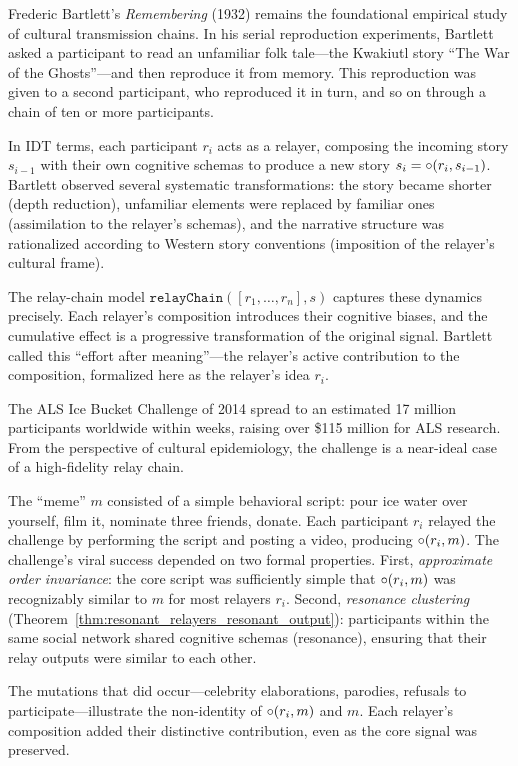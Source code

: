 \begin{example}
\label{ex:bartlett}
Frederic Bartlett's \textit{Remembering} (1932) remains the foundational
empirical study of cultural transmission chains.  In his serial
reproduction experiments, Bartlett asked a participant to read an unfamiliar
folk tale---the Kwakiutl story ``The War of the Ghosts''---and then
reproduce it from memory.  This reproduction was given to a second
participant, who reproduced it in turn, and so on through a chain of ten or
more participants.

In IDT terms, each participant $r_i$ acts as a relayer, composing the
incoming story $s_{i-1}$ with their own cognitive schemas to produce a new
story $s_i = \circ(r_i, s_{i-1})$.  Bartlett observed several systematic
transformations: the story became shorter (depth reduction), unfamiliar
elements were replaced by familiar ones (assimilation to the relayer's
schemas), and the narrative structure was rationalized according to Western
story conventions (imposition of the relayer's cultural frame).

The relay-chain model $\texttt{relayChain}([r_1, \ldots, r_n], s)$
captures these dynamics precisely.  Each relayer's composition introduces
their cognitive biases, and the cumulative effect is a progressive
transformation of the original signal.  Bartlett called this
``effort after meaning''---the relayer's active contribution to the
composition, formalized here as the relayer's idea $r_i$.
\end{example}

\begin{example}
\label{ex:ice-bucket}
The ALS Ice Bucket Challenge of 2014 spread to an estimated 17 million
participants worldwide within weeks, raising over \$115 million for ALS
research.  From the perspective of cultural epidemiology, the challenge
is a near-ideal case of a high-fidelity relay chain.

The ``meme'' $m$ consisted of a simple behavioral script: pour ice water
over yourself, film it, nominate three friends, donate.  Each participant
$r_i$ relayed the challenge by performing the script and posting a video,
producing $\circ(r_i, m)$.  The challenge's viral success depended on
two formal properties.  First, \emph{approximate order invariance}: the
core script was sufficiently simple that $\circ(r_i, m)$ was
recognizably similar to $m$ for most relayers $r_i$.  Second,
\emph{resonance clustering} (Theorem~\ref{thm:resonant_relayers_resonant_output}):
participants within the same social network shared cognitive schemas
(resonance), ensuring that their relay outputs were similar to each other.

The mutations that did occur---celebrity elaborations, parodies, refusals
to participate---illustrate the non-identity of $\circ(r_i, m)$ and $m$.
Each relayer's composition added their distinctive contribution, even as
the core signal was preserved.
\end{example}

